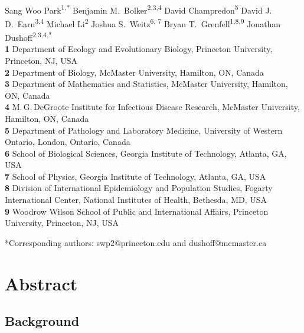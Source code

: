 \documentclass[12pt]{article}
\date{\today}
\begin{document}
\begin{flushleft}{
	\Large
	\textbf{}
}
\newline
\\
Sang Woo Park\textsuperscript{1,*}
Benjamin M.\ Bolker\textsuperscript{2,3,4}
David Champredon\textsuperscript{5}
David J.\,D.\ Earn\textsuperscript{3,4}
Michael Li\textsuperscript{2}
Joshua S.\ Weitz\textsuperscript{6, 7}
Bryan T.\ Grenfell\textsuperscript{1,8,9}
Jonathan Dushoff\textsuperscript{2,3,4,*}
\\
\bigskip
\textbf{1} Department of Ecology and Evolutionary Biology, Princeton University, Princeton, NJ, USA
\\
\textbf{2} Department of Biology, McMaster University, Hamilton, ON, Canada
\\
\textbf{3} Department of Mathematics and Statistics, McMaster University, Hamilton, ON, Canada
\\
\textbf{4} M.\,G.\,DeGroote Institute for Infectious Disease Research, McMaster University, Hamilton, ON, Canada
\\
\textbf{5} Department of Pathology and Laboratory Medicine, University of Western Ontario, London, Ontario, Canada
\\
\textbf{6} School of Biological Sciences, Georgia Institute of Technology, Atlanta, GA, USA
\\
\textbf{7} School of Physics, Georgia Institute of Technology, Atlanta, GA, USA
\\
\textbf{8} Division of International Epidemiology and Population Studies, Fogarty International Center, National Institutes of Health, Bethesda, MD, USA
\\
\textbf{9} Woodrow Wilson School of Public and International Affairs, Princeton University, Princeton, NJ, USA
\\
\bigskip

*Corresponding authors: swp2@princeton.edu and dushoff@mcmaster.ca
\end{flushleft}

\pagebreak

\section*{Abstract}

\subsection*{Background}
\end{document}
